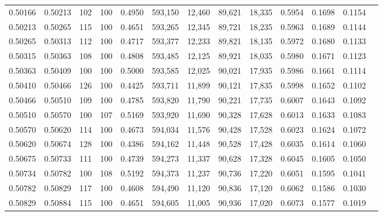 \begin{tabular}{rrrrrrrrrrrrr}
0.50166 & 0.50213 &    102 & 100 &                                     0.4950 & 593,150 &  12,460 &  89,621 &  18,335 & 0.5954 & 0.1698 & 0.1154 \\
0.50213 & 0.50265 &    115 & 100 &                                     0.4651 & 593,265 &  12,345 &  89,721 &  18,235 & 0.5963 & 0.1689 & 0.1144 \\
0.50265 & 0.50313 &    112 & 100 &                                     0.4717 & 593,377 &  12,233 &  89,821 &  18,135 & 0.5972 & 0.1680 & 0.1133 \\
0.50315 & 0.50363 &    108 & 100 &                                     0.4808 & 593,485 &  12,125 &  89,921 &  18,035 & 0.5980 & 0.1671 & 0.1123 \\
0.50363 & 0.50409 &    100 & 100 &                                     0.5000 & 593,585 &  12,025 &  90,021 &  17,935 & 0.5986 & 0.1661 & 0.1114 \\
0.50410 & 0.50466 &    126 & 100 &                                     0.4425 & 593,711 &  11,899 &  90,121 &  17,835 & 0.5998 & 0.1652 & 0.1102 \\
0.50466 & 0.50510 &    109 & 100 &                                     0.4785 & 593,820 &  11,790 &  90,221 &  17,735 & 0.6007 & 0.1643 & 0.1092 \\
0.50510 & 0.50570 &    100 & 107 &                                     0.5169 & 593,920 &  11,690 &  90,328 &  17,628 & 0.6013 & 0.1633 & 0.1083 \\
0.50570 & 0.50620 &    114 & 100 &                                     0.4673 & 594,034 &  11,576 &  90,428 &  17,528 & 0.6023 & 0.1624 & 0.1072 \\
0.50620 & 0.50674 &    128 & 100 &                                     0.4386 & 594,162 &  11,448 &  90,528 &  17,428 & 0.6035 & 0.1614 & 0.1060 \\
0.50675 & 0.50733 &    111 & 100 &                                     0.4739 & 594,273 &  11,337 &  90,628 &  17,328 & 0.6045 & 0.1605 & 0.1050 \\
0.50734 & 0.50782 &    100 & 108 &                                     0.5192 & 594,373 &  11,237 &  90,736 &  17,220 & 0.6051 & 0.1595 & 0.1041 \\
0.50782 & 0.50829 &    117 & 100 &                                     0.4608 & 594,490 &  11,120 &  90,836 &  17,120 & 0.6062 & 0.1586 & 0.1030 \\
0.50829 & 0.50884 &    115 & 100 &                                     0.4651 & 594,605 &  11,005 &  90,936 &  17,020 & 0.6073 & 0.1577 & 0.1019 \\

\end{tabular}
